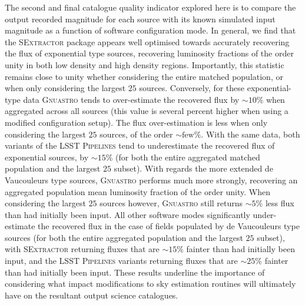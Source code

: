 \documentclass[fleqn,usenatbib,useAMS]{mnras}
\newcommand*{\about}{\mathord\sim}
\newcommand*{\SExtractor}{\textsc{SExtractor}\xspace}
\newcommand*{\Gnuastro}{\textsc{Gnuastro}\xspace}
\newcommand*{\LSSTPs}{\textsc{LSST Pipelines}\xspace}
\begin{document}
The second and final catalogue quality indicator explored here is to compare the output recorded magnitude for each source with its known simulated input magnitude as a function of software configuration mode. In general, we find that the \SExtractor package appears well optimised towards accurately recovering the flux of exponential type sources, recovering luminosity fractions of the order unity in both low density and high density regions. Importantly, this statistic remains close to unity whether considering the entire matched population, or when only considering the largest $25$ sources. Conversely, for these exponential-type data \Gnuastro tends to over-estimate the recovered flux by $\about10\%$ when aggregated across all sources (this value is several percent higher when using a modified configuration setup). The flux over-estimation is less when only considering the largest $25$ sources, of the order $\about\mathrm{few}\%$. With the same data, both variants of the \LSSTPs tend to underestimate the recovered flux of exponential sources, by $\about15\%$ (for both the entire aggregated matched population and the largest $25$ subset). With regards the more extended de Vaucouleurs type sources, \Gnuastro performs much more strongly, recovering an aggregated population mean luminosity fraction of the order unity. When considering the largest $25$ sources however, \Gnuastro still returns $\about5\%$ less flux than had initially been input. All other software modes significantly under-estimate the recovered flux in the case of fields populated by de Vaucouleurs type sources (for both the entire aggregated population and the largest $25$ subset), with \SExtractor returning fluxes that are $\about15\%$ fainter than had initially been input, and the \LSSTPs variants returning fluxes that are $\about25\%$ fainter than had initially been input. These results underline the importance of considering what impact modifications to sky estimation routines will ultimately have on the resultant output science catalogues.
\end{document}

